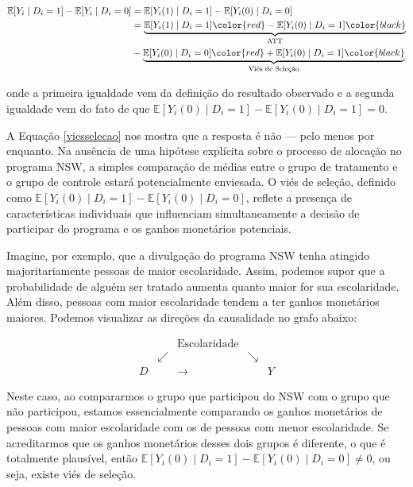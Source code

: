 \begin{equation}\label{viesselecao}
    \begin{split}
        \mathbb{E}[Y_i \mid D_i = 1] - \mathbb{E}[Y_i \mid D_i = 0] & = \mathbb{E}[Y_i(1) \mid D_i = 1] - \mathbb{E}[Y_i(0) \mid D_i = 0]\\
        & = \underbrace{\mathbb{E}[Y_i(1) \mid D_i = 1] \color{red} -\mathbb{E}[Y_i(0) \mid D_i = 1]\color{black}}_{\text{ATT}} \\
        & - \underbrace{\mathbb{E}[Y_i(0) \mid D_i = 0] \color{red} + \mathbb{E}[Y_i(0) \mid D_i = 1] \color{black}}_{\text{Viés de Seleção}}
    \end{split}
\end{equation}

\noindent onde a primeira igualdade vem da definição do resultado observado e a segunda igualdade vem do fato de que $\mathbb{E}[Y_i(0) \mid D_i = 1] - \mathbb{E}[Y_i(0) \mid D_i = 1] = 0$. 

A Equação \eqref{viesselecao} nos mostra que a resposta é não — pelo menos por enquanto. Na ausência de uma hipótese explícita sobre o processo de alocação no programa NSW, a simples comparação de médias entre o grupo de tratamento e o grupo de controle estará potencialmente enviesada. O viés de seleção, definido como $\mathbb{E}[Y_i(0) \mid D_i = 1] - \mathbb{E}[Y_i(0) \mid D_i = 0]$, reflete a presença de características individuais que influenciam simultaneamente a decisão de participar do programa e os ganhos monetários potenciais.


Imagine, por exemplo, que a divulgação do programa NSW tenha atingido majoritariamente pessoas de maior escolaridade. Assim, podemos supor que a probabilidade de alguém ser tratado aumenta quanto maior for sua escolaridade. Além disso, pessoas com maior escolaridade tendem a ter ganhos monetários maiores. Podemos visualizar as direções da causalidade no grafo abaixo:

\[
\begin{array}{ccccc}
  & & \text{Escolaridade} & & \\
  & \swarrow & & \searrow \\
  D & &\longrightarrow && Y
\end{array}
\]

Neste caso, ao compararmos o grupo que participou do NSW com o grupo que não participou, estamos essencialmente comparando os ganhos monetários de pessoas com maior escolaridade com os de pessoas com menor escolaridade. Se acreditarmos que os ganhos monetários desses dois grupos é diferente, o que é totalmente plausível, então $\mathbb{E}[Y_i(0) \mid D_i = 1] - \mathbb{E}[Y_i(0) \mid D_i = 0] \neq 0$, ou seja, existe viés de seleção.

